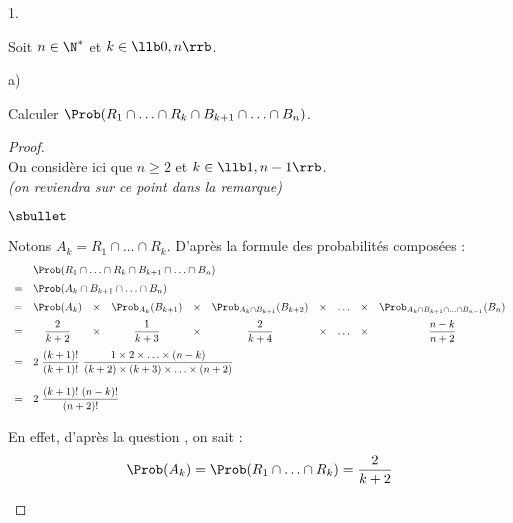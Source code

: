 \documentclass[11pt]{article}%
\begin{document}
\begin{noliste}{1.}
\item Soit $n \in \N^*$ et $k \in \llb 0, n \rrb$.
  \begin{noliste}{a)}
  \item Calculer $\Prob(R_1 \cap \ldots \cap R_k \cap B_{k+1} \cap
    \ldots \cap B_n)$.

    \begin{proof}~\\
      On considère ici que $n \geq 2$ et $k \in \llb 1, n-1 \rrb$.\\
      {\it (on reviendra sur ce point dans la remarque)}
      \begin{noliste}{$\sbullet$}
      \item Notons $A_k = R_1 \cap \ldots \cap R_{k}$. D'après la
        formule des probabilités composées :
        \[
        \begin{array}{cccccccccc}
          & \multicolumn{9}{l}{\Prob(R_1 \cap \ldots \cap R_{k}
            \cap B_{k+1} \cap \ldots \cap B_n)} \\[.2cm] 
          = & \multicolumn{9}{l}{\Prob(A_{k} \cap B_{k+1} \cap
            \ldots \cap B_n)} \\[.2cm]  
          = & \Prob(A_k) & \times & \Prob_{A_k}(B_{k+1}) & \times &
          \Prob_{A_k \cap B_{k+1}}(B_{k+2}) & \times & \ldots
          & \times & \Prob_{A_k \cap B_{k+1} \cap \ldots \cap
            B_{n-1}}(B_{n}) \\[.2cm] 
          = & \dfrac{2}{k+2} & \times & \dfrac{1}{k+3} & \times &
          \dfrac{2}{k+4} & \times & \ldots & \times & 
          \dfrac{n-k}{n+2}  \\[.4cm] 
          = & \multicolumn{9}{l}{
            2 \ \dfrac{(k+1)!}{(k+1)!} \ \dfrac{1 \times 2 \times
              \ldots \times (n-k)}{(k+2) \times (k+3) \times
              \ldots \times (n+2)}
          } \\[.6cm] 
          = & \multicolumn{9}{l}{
            2 \ \dfrac{(k+1)! \ (n-k)!}{(n+2)!}
          }
        \end{array}
        \]

      \item En effet, d'après la question , on sait : 
        \[
        \Prob(A_k) = \Prob(R_1 \cap \ldots \cap R_{k}) = \dfrac{2}{k+2}
        \]


\end{noliste}
\end{proof}
\end{noliste}
\end{noliste}
\end{document}
